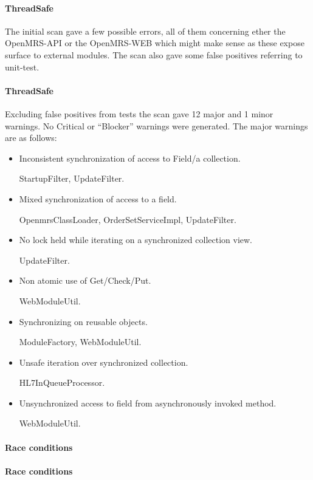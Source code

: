 \documentclass{report} %
\begin{document}
\paragraph{ThreadSafe} %

The initial scan gave a few possible errors, all of them concerning ether the
OpenMRS-API or the OpenMRS-WEB which might make sense as these expose surface to
external modules. The scan also gave some false positives referring to
unit-test.

\paragraph{ThreadSafe} %

Excluding false positives from tests the scan gave 12 major and 1 minor
warnings. No Critical or ``Blocker'' warnings were generated. The major warnings
are as follows:

\begin{itemize}
\item Inconsistent synchronization of access to Field/a collection.

  StartupFilter, UpdateFilter.

\item Mixed synchronization of access to a field.

  OpenmrsClassLoader, OrderSetServiceImpl, UpdateFilter.
  
\item No lock held while iterating on a synchronized collection view.
  
  UpdateFilter.

\item Non atomic use of Get/Check/Put.

  WebModuleUtil.

\item Synchronizing on reusable objects.

  ModuleFactory, WebModuleUtil.

\item Unsafe iteration over synchronized collection.

  HL7InQueueProcessor.
  
\item Unsynchronized access to field from asynchronously invoked method.
  
  WebModuleUtil.

\end{itemize}
  
 


\paragraph{Race conditions}


\paragraph{Race conditions}


\end{document}
